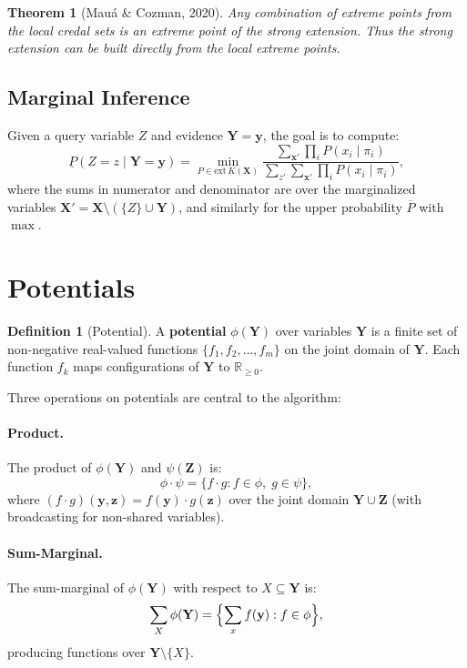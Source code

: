 \documentclass[11pt]{article}
\newtheorem{theorem}{Theorem}
\theoremstyle{definition}
\newtheorem{definition}{Definition}
\begin{document}
\begin{theorem}[Mau\'a \& Cozman, 2020]
Any combination of extreme points from the local credal sets is an extreme point of the
strong extension. Thus the strong extension can be built directly from the local extreme
points.
\end{theorem}

\subsection{Marginal Inference}

Given a query variable $Z$ and evidence $\mathbf{Y} = \mathbf{y}$, the goal is to compute:
\begin{equation}\label{eq:marginal}
  \underline{P}(Z = z \mid \mathbf{Y} = \mathbf{y}) = \min_{P \in \mathrm{ext}\,K(\mathbf{X})}
  \frac{\sum_{\mathbf{x}'} \prod_i P(x_i \mid \pi_i)}
       {\sum_{z'} \sum_{\mathbf{x}'} \prod_i P(x_i \mid \pi_i)},
\end{equation}
where the sums in numerator and denominator are over the marginalized variables
$\mathbf{X}' = \mathbf{X} \setminus (\{Z\} \cup \mathbf{Y})$, and similarly for the
upper probability $\overline{P}$ with $\max$.

\section{Potentials}

\begin{definition}[Potential]
A \textbf{potential} $\phi(\mathbf{Y})$ over variables $\mathbf{Y}$ is a finite set
of non-negative real-valued functions $\{f_1, f_2, \dots, f_m\}$ on the joint domain
of $\mathbf{Y}$. Each function $f_k$ maps configurations of $\mathbf{Y}$ to
$\mathbb{R}_{\geq 0}$.
\end{definition}

Three operations on potentials are central to the algorithm:

\paragraph{Product.}
The product of $\phi(\mathbf{Y})$ and $\psi(\mathbf{Z})$ is:
\[
  \phi \cdot \psi = \{f \cdot g : f \in \phi, \; g \in \psi\},
\]
where $(f \cdot g)(\mathbf{y}, \mathbf{z}) = f(\mathbf{y}) \cdot g(\mathbf{z})$
over the joint domain $\mathbf{Y} \cup \mathbf{Z}$ (with broadcasting for
non-shared variables).

\paragraph{Sum-Marginal.}
The sum-marginal of $\phi(\mathbf{Y})$ with respect to $X \subseteq \mathbf{Y}$ is:
\[
  \sum_{X} \phi(\mathbf{Y}) = \Bigl\{ \sum_{x} f(\mathbf{y}) : f \in \phi \Bigr\},
\]
producing functions over $\mathbf{Y} \setminus \{X\}$.
\end{document}

